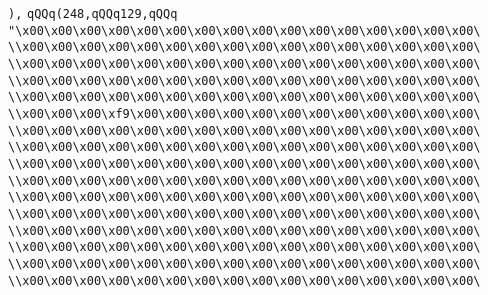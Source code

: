 \verb|),|\newline
\verb|qQQq(248,qQQq129,qQQq|\newline
\verb|"\x00\x00\x00\x00\x00\x00\x00\x00\x00\x00\x00\x00\x00\x00\x00\x00\|\newline
\verb|\\x00\x00\x00\x00\x00\x00\x00\x00\x00\x00\x00\x00\x00\x00\x00\x00\|\newline
\verb|\\x00\x00\x00\x00\x00\x00\x00\x00\x00\x00\x00\x00\x00\x00\x00\x00\|\newline
\verb|\\x00\x00\x00\x00\x00\x00\x00\x00\x00\x00\x00\x00\x00\x00\x00\x00\|\newline
\verb|\\x00\x00\x00\x00\x00\x00\x00\x00\x00\x00\x00\x00\x00\x00\x00\x00\|\newline
\verb|\\x00\x00\x00\xf9\x00\x00\x00\x00\x00\x00\x00\x00\x00\x00\x00\x00\|\newline
\verb|\\x00\x00\x00\x00\x00\x00\x00\x00\x00\x00\x00\x00\x00\x00\x00\x00\|\newline
\verb|\\x00\x00\x00\x00\x00\x00\x00\x00\x00\x00\x00\x00\x00\x00\x00\x00\|\newline
\verb|\\x00\x00\x00\x00\x00\x00\x00\x00\x00\x00\x00\x00\x00\x00\x00\x00\|\newline
\verb|\\x00\x00\x00\x00\x00\x00\x00\x00\x00\x00\x00\x00\x00\x00\x00\x00\|\newline
\verb|\\x00\x00\x00\x00\x00\x00\x00\x00\x00\x00\x00\x00\x00\x00\x00\x00\|\newline
\verb|\\x00\x00\x00\x00\x00\x00\x00\x00\x00\x00\x00\x00\x00\x00\x00\x00\|\newline
\verb|\\x00\x00\x00\x00\x00\x00\x00\x00\x00\x00\x00\x00\x00\x00\x00\x00\|\newline
\verb|\\x00\x00\x00\x00\x00\x00\x00\x00\x00\x00\x00\x00\x00\x00\x00\x00\|\newline
\verb|\\x00\x00\x00\x00\x00\x00\x00\x00\x00\x00\x00\x00\x00\x00\x00\x00\|\newline
\verb|\\x00\x00\x00\x00\x00\x00\x00\x00\x00\x00\x00\x00\x00\x00\x00\x00\|\newline
